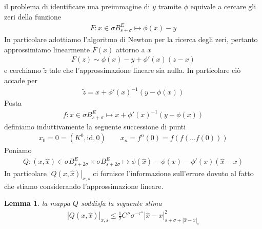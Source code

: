 \documentclass[twoside, 11pt]{amsbook}
\makeatletter
\newcommand{\0}{{(0)}}
\newcommand{\3}{{(3)}}
\theoremstyle{colonplain}
\newtheorem{lemma}[thm]{Lemma}
\theoremstyle{colondefinition}
\theoremstyle{colonremark}
\numberwithin{equation}{chapter}
\renewcommand{\proofname}{Dimostrazione}
\renewenvironment{proof}[1][\proofname]{\par
  \pushQED{\qed}%
  \normalfont \topsep6\p@\@plus6\p@\relax
  \trivlist
  \item[\hskip\labelsep\bfseries #1:]\ignorespaces
}{%
  \popQED\endtrivlist\@endpefalse
}
\makeatother
\begin{document}
\begin{proof} il problema di identificare una preimmagine di $y$ tramite $\phi$ equivale a cercare gli zeri della funzione
\begin{align}
    F: x \in \sigma B^E_{s + \sigma} \mapsto \phi(x) - y 
\end{align}
In particolare adottiamo l'algoritmo di Newton per la ricerca degli zeri, pertanto approssimiamo linearmente $F(x)$ attorno a $x$
\begin{align}
    F(z) \sim \phi(x) - y + \phi'(x)(z - x) 
\end{align}
e cerchiamo $\widetilde{z}$ tale che l'approssimazione lineare sia nulla. In particolare ciò accade per
\begin{align}\label{FirstOrdCanc}
    \widetilde{z} = x + \phi'(x)^{-1}(y - \phi(x)) 
\end{align}
Posta
\begin{align}\label{AlgFunct}
    f : x \in \sigma B^E_{s + \sigma} \mapsto x + \phi'(x)^{-1}(y - \phi(x)) 
\end{align}
definiamo induttivamente la seguente successione di punti
\begin{align}\label{NewtonSeq}
    x_0 = 0 = (K^0, \mathrm{id}, 0) \qquad x_n = f^n(0) = f(f(\dots f(0))) 
\end{align}
Poniamo
\begin{align}
    Q : (x, \hat{x}) \in \sigma B^E_{s + 2\sigma} \times \sigma B^E_{s + 2\sigma} \mapsto \phi(\hat{x}) - \phi(x) - \phi'(x)(\hat{x} - x)
\end{align}
In particolare $|Q(x, \hat{x})|_{x, s}$ ci fornisce l'informazione sull'errore dovuto al fatto che stiamo considerando l'approssimazione lineare.
\begin{lemma}\label{QEst} la mappa $Q$ soddisfa la seguente stima
\begin{align}
    |Q(x, \hat{x})|_{x, s} \leq \frac{1}{2}C''\sigma^{-\tau''}|\hat{x} - x|^2_{s + \sigma + |\hat{x} - x|_s}
\end{align}
\end{lemma}


\end{proof}
\end{document}

